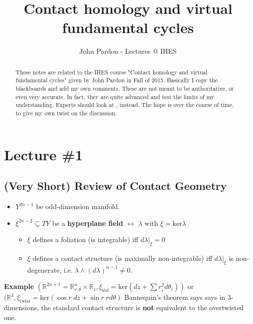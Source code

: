 \documentclass[12pt]{article}
\title{Contact homology and virtual fundamental cycles}
\author{John Pardon - Lectures @ IHES}
\date{}
\begin{document}
{\selectfont

\maketitle

\begin{abstract}
These notes are related to the IHES course "Contact homology and virtual fundamental cycles" given by John Pardon in Fall of 2015.  Basically I copy the blackboards and add my own comments.  These are not meant to be authoritative, or even very accurate.  In fact, they are quite advanced and test the limits of my understanding. Experts should look at \cite{P}, instead. The hope is over the course of time, to give my own twist on the discussion.
\end{abstract}

\section{Lecture \#1 }


\subsection{(Very Short) Review of Contact Geometry}

\begin{itemize}
\item $Y^{2n-1}$ be odd-dimension manifold.
\item $\xi^{2n-2} \subseteq TY$ be a \textbf{hyperplane field} $\longleftrightarrow$ $\lambda$ with $\xi = \mathrm{ker} \lambda$
\begin{itemize}
\item $\xi$ defines a foliation (is integrable) iff $d\lambda|_\xi = 0$
\item $\xi$ defines a contact structure (is maximally non-integrable) 
iff $d\lambda|_\xi$ is non-degenerate, i.e. $\lambda \wedge (d\lambda)^{n-1} \neq 0$.
\end{itemize}
\end{itemize}

\noindent \textbf{Example}  $(\mathbb{R}^{2n+1} = \mathbb{R}_{r,\theta}^n \times \mathbb{R}_z, \xi_{\text{std}} = \mathrm{ker}(dz + \sum r_i^2 d\theta_i)) $ or $(\mathbb{R}^3, \xi_{\text{twist}} = \mathrm{ker}( \cos r \; dz + \sin r \; r d\theta) $  Bannequin's theorem says says in 3-dimensions, the standard contact structure is \textbf{not} equivalent to the overtwisted one. \newline

}
\end{document}
